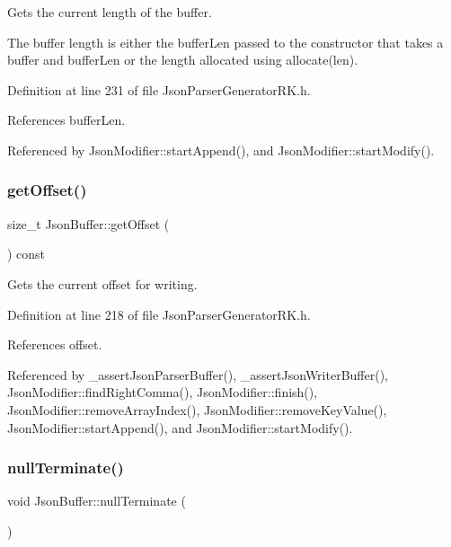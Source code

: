 Gets the current length of the buffer. 

The buffer length is either the buffer\+Len passed to the constructor that takes a buffer and buffer\+Len or the length allocated using allocate(len). 

Definition at line 231 of file Json\+Parser\+Generator\+R\+K.\+h.



References buffer\+Len.



Referenced by Json\+Modifier\+::start\+Append(), and Json\+Modifier\+::start\+Modify().

\mbox{\label{class_json_buffer_adedc049fc02ef5bad2b3f8e7a1ba17b6}} 
\subsubsection{\texorpdfstring{get\+Offset()}{getOffset()}}
{\footnotesize\ttfamily size\+\_\+t Json\+Buffer\+::get\+Offset (\begin{DoxyParamCaption}{ }\end{DoxyParamCaption}) const\hspace{0.3cm}{\ttfamily [inline]}}



Gets the current offset for writing. 



Definition at line 218 of file Json\+Parser\+Generator\+R\+K.\+h.



References offset.



Referenced by \+\_\+assert\+Json\+Parser\+Buffer(), \+\_\+assert\+Json\+Writer\+Buffer(), Json\+Modifier\+::find\+Right\+Comma(), Json\+Modifier\+::finish(), Json\+Modifier\+::remove\+Array\+Index(), Json\+Modifier\+::remove\+Key\+Value(), Json\+Modifier\+::start\+Append(), and Json\+Modifier\+::start\+Modify().

\mbox{\label{class_json_buffer_a9f649ceeed76bb798c0bf9792b56d743}} 
\subsubsection{\texorpdfstring{null\+Terminate()}{nullTerminate()}}
{\footnotesize\ttfamily void Json\+Buffer\+::null\+Terminate (\begin{DoxyParamCaption}{ }\end{DoxyParamCaption})}



